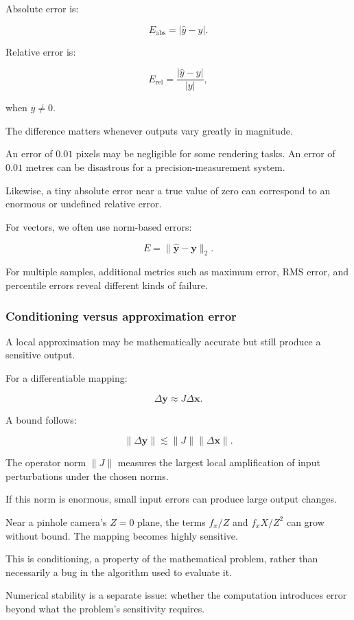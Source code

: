 Absolute error is:

\[
E_{\text{abs}}=|\hat y-y|.
\]

Relative error is:

\[
E_{\text{rel}}=\frac{|\hat y-y|}{|y|},
\]

when \(y\ne0\).

The difference matters whenever outputs vary greatly in magnitude.

An error of \(0.01\) pixels may be negligible for some rendering tasks. An error of \(0.01\) metres can be disastrous for a precision-measurement system.

Likewise, a tiny absolute error near a true value of zero can correspond to an enormous or undefined relative error.

For vectors, we often use norm-based errors:

\[
E=\|\hat{\mathbf y}-\mathbf y\|_2.
\]

For multiple samples, additional metrics such as maximum error, RMS error, and percentile errors reveal different kinds of failure.

\subsubsection{Conditioning versus approximation error}\label{02-foundations-ii-ch021-conditioning-versus-approximation-error}

A local approximation may be mathematically accurate but still produce a sensitive output.

For a differentiable mapping:

\[
\Delta\mathbf y\approx J\Delta\mathbf x.
\]

A bound follows:

\[
\|\Delta\mathbf y\| \lesssim \|J\|\|\Delta\mathbf x\|.
\]

The operator norm \(\|J\|\) measures the largest local amplification of input perturbations under the chosen norms.

If this norm is enormous, small input errors can produce large output changes.

Near a pinhole camera's \(Z=0\) plane, the terms \(f_x/Z\) and \(f_xX/Z^2\) can grow without bound. The mapping becomes highly sensitive.

This is conditioning, a property of the mathematical problem, rather than necessarily a bug in the algorithm used to evaluate it.

Numerical stability is a separate issue: whether the computation introduces error beyond what the problem's sensitivity requires.

